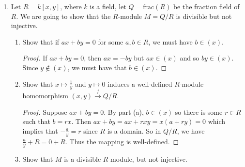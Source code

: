\documentclass[11pt,oneside,english]{amsart}
\theoremstyle{definition}
\newcommand{\lspace}{\vspace{5mm}}
\begin{document}
\rightline{\today}

\lspace




\begin{enumerate}[leftmargin=*]
\itemsep5mm

\item Let $R=k[x,y]$, where $k$ is a field, let $Q = \textrm{frac}(R)$ be the fraction field of $R$. We are going to show that the $R$-module $M = Q/R$ is divisible but not injective.
\begin{enumerate}
\item Show that if $ax + by = 0$ for some $a, b \in R$, we must have $b \in (x)$.
\begin{proof}
If $ax+by=0$, then $ax=-by$ but $ax\in (x)$ and so $by\in(x)$. Since $y\notin(x)$, we must have that $b\in (x)$.
\end{proof}

\item Show that $x \mapsto \frac{1}{y}$ and $y \mapsto 0$ induces a well-defined $R$-module homomorphism $(x,y) \xrightarrow{\, f \,} Q/R$.

\begin{proof}
Suppose $ax+by=0$. By part (a), $b\in (x)$ so there is some $r\in R$ such that $b=rx$. Then $ax+by=ax+rxy=x(a+ry)=0$ which implies that $-\frac{a}{y}=r$ since $R$ is a domain. So in $Q/R$, we have $\frac{a}{y}+R=0+R$. Thus the mapping is well-defined.
\end{proof}

\item Show that $M$ is a divisible $R$-module, but not injective.


\end{enumerate}
\end{enumerate}
\end{document}
